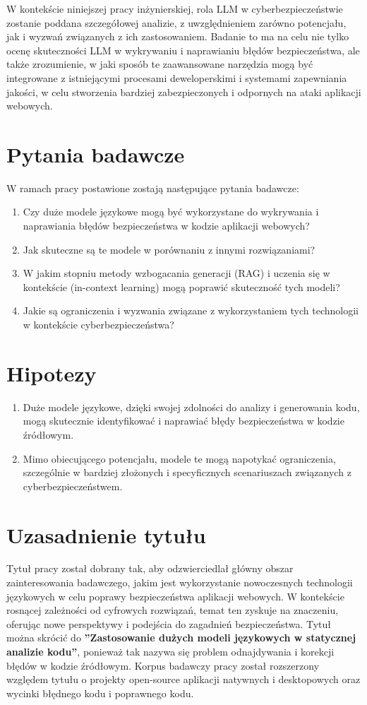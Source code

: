 W kontekście niniejszej pracy inżynierskiej, rola LLM w cyberbezpieczeństwie zostanie poddana szczegółowej analizie, z uwzględnieniem zarówno potencjału, jak i wyzwań związanych z ich zastosowaniem. Badanie to ma na celu nie tylko ocenę skuteczności LLM w wykrywaniu i naprawianiu błędów bezpieczeństwa, ale także zrozumienie, w jaki sposób te zaawansowane narzędzia mogą być integrowane z istniejącymi procesami deweloperskimi i systemami zapewniania jakości, w celu stworzenia bardziej zabezpieczonych i odpornych na ataki aplikacji webowych.


\section*{Pytania badawcze}
W ramach pracy postawione zostają następujące pytania badawcze:
\begin{enumerate}
    \item Czy duże modele językowe mogą być wykorzystane do wykrywania i naprawiania błędów bezpieczeństwa w kodzie aplikacji webowych?
    \item Jak skuteczne są te modele w porównaniu z innymi rozwiązaniami?
    \item W jakim stopniu metody wzbogacania generacji (RAG) i uczenia się w kontekście (in-context learning) mogą poprawić skuteczność tych modeli?
    \item Jakie są ograniczenia i wyzwania związane z wykorzystaniem tych technologii w kontekście cyberbezpieczeństwa?
\end{enumerate}

\section*{Hipotezy}
\begin{enumerate}
    \item Duże modele językowe, dzięki swojej zdolności do analizy i generowania kodu, mogą skutecznie identyfikować i naprawiać błędy bezpieczeństwa w kodzie źródłowym.
    \item Mimo obiecującego potencjału, modele te mogą napotykać ograniczenia, szczególnie w bardziej złożonych i specyficznych scenariuszach związanych z cyberbezpieczeństwem.
\end{enumerate}

\section*{Uzasadnienie tytułu}
Tytuł pracy został dobrany tak, aby odzwierciedlał główny obszar zainteresowania badawczego, jakim jest wykorzystanie nowoczesnych technologii językowych w celu poprawy bezpieczeństwa aplikacji webowych. 
W kontekście rosnącej zależności od cyfrowych rozwiązań, temat ten zyskuje na znaczeniu, oferując nowe perspektywy i podejścia do zagadnień bezpieczeństwa.
Tytuł można skrócić do \textbf{''Zastosowanie dużych modeli językowych w statycznej analizie kodu''}, ponieważ tak nazywa się problem odnajdywania i korekcji błędów w kodzie źródłowym. 
Korpus badawczy pracy został rozszerzony względem tytułu o projekty open-source aplikacji natywnych i desktopowych oraz wycinki błędnego kodu i poprawnego kodu. 

